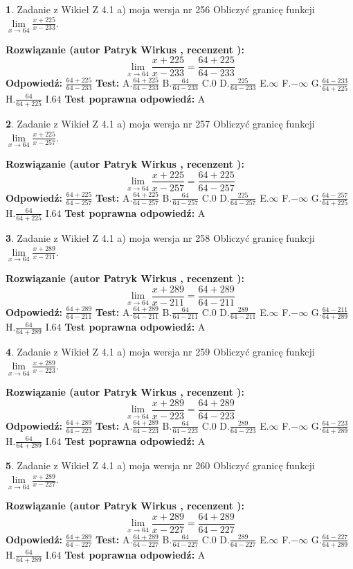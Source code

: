 \documentclass[12pt, a4paper]{article}
\theoremstyle{definition} %
\newtheorem{zad}{}
\newcommand{\zadStart}[1]{\begin{zad}#1\newline}
\newcommand{\zadStop}{\end{zad}}
\newcommand{\rozwStart}[2]{\noindent \textbf{Rozwiązanie (autor #1 , recenzent #2): }\newline}
\newcommand{\rozwStop}{\newline}
\newcommand{\odpStart}{\noindent \textbf{Odpowiedź:}\newline}
\newcommand{\odpStop}{\newline}
\newcommand{\testStart}{\noindent \textbf{Test:}\newline}
\newcommand{\testStop}{\newline}
\newcommand{\kluczStart}{\noindent \textbf{Test poprawna odpowiedź:}\newline}
\newcommand{\kluczStop}{\newline}
\begin{document}
\zadStart{Zadanie z Wikieł Z 4.1 a) moja wersja nr 256}
Obliczyć granicę funkcji $\lim\limits_{x\to64}\frac{x+225}{x-233}$.
\zadStop
\rozwStart{Patryk Wirkus}{}
$$\lim\limits_{x\to64}\frac{x+225}{x-233} = \frac{64+225}{64-233}$$
\rozwStop
\odpStart
$\frac{64+225}{64-233}$
\odpStop
\testStart
A.$\frac{64+225}{64-233}$
B.$\frac{64}{64-233}$
C.$0$
D.$\frac{225}{64-233}$
E.$\infty$
F.$-\infty$
G.$\frac{64-233}{64+225}$
H.$\frac{64}{64+225}$
I.$64$
\testStop
\kluczStart
A
\kluczStop



\zadStart{Zadanie z Wikieł Z 4.1 a) moja wersja nr 257}
Obliczyć granicę funkcji $\lim\limits_{x\to64}\frac{x+225}{x-257}$.
\zadStop
\rozwStart{Patryk Wirkus}{}
$$\lim\limits_{x\to64}\frac{x+225}{x-257} = \frac{64+225}{64-257}$$
\rozwStop
\odpStart
$\frac{64+225}{64-257}$
\odpStop
\testStart
A.$\frac{64+225}{64-257}$
B.$\frac{64}{64-257}$
C.$0$
D.$\frac{225}{64-257}$
E.$\infty$
F.$-\infty$
G.$\frac{64-257}{64+225}$
H.$\frac{64}{64+225}$
I.$64$
\testStop
\kluczStart
A
\kluczStop



\zadStart{Zadanie z Wikieł Z 4.1 a) moja wersja nr 258}
Obliczyć granicę funkcji $\lim\limits_{x\to64}\frac{x+289}{x-211}$.
\zadStop
\rozwStart{Patryk Wirkus}{}
$$\lim\limits_{x\to64}\frac{x+289}{x-211} = \frac{64+289}{64-211}$$
\rozwStop
\odpStart
$\frac{64+289}{64-211}$
\odpStop
\testStart
A.$\frac{64+289}{64-211}$
B.$\frac{64}{64-211}$
C.$0$
D.$\frac{289}{64-211}$
E.$\infty$
F.$-\infty$
G.$\frac{64-211}{64+289}$
H.$\frac{64}{64+289}$
I.$64$
\testStop
\kluczStart
A
\kluczStop



\zadStart{Zadanie z Wikieł Z 4.1 a) moja wersja nr 259}
Obliczyć granicę funkcji $\lim\limits_{x\to64}\frac{x+289}{x-223}$.
\zadStop
\rozwStart{Patryk Wirkus}{}
$$\lim\limits_{x\to64}\frac{x+289}{x-223} = \frac{64+289}{64-223}$$
\rozwStop
\odpStart
$\frac{64+289}{64-223}$
\odpStop
\testStart
A.$\frac{64+289}{64-223}$
B.$\frac{64}{64-223}$
C.$0$
D.$\frac{289}{64-223}$
E.$\infty$
F.$-\infty$
G.$\frac{64-223}{64+289}$
H.$\frac{64}{64+289}$
I.$64$
\testStop
\kluczStart
A
\kluczStop



\zadStart{Zadanie z Wikieł Z 4.1 a) moja wersja nr 260}
Obliczyć granicę funkcji $\lim\limits_{x\to64}\frac{x+289}{x-227}$.
\zadStop
\rozwStart{Patryk Wirkus}{}
$$\lim\limits_{x\to64}\frac{x+289}{x-227} = \frac{64+289}{64-227}$$
\rozwStop
\odpStart
$\frac{64+289}{64-227}$
\odpStop
\testStart
A.$\frac{64+289}{64-227}$
B.$\frac{64}{64-227}$
C.$0$
D.$\frac{289}{64-227}$
E.$\infty$
F.$-\infty$
G.$\frac{64-227}{64+289}$
H.$\frac{64}{64+289}$
I.$64$
\testStop
\kluczStart
A
\kluczStop
\end{document}
